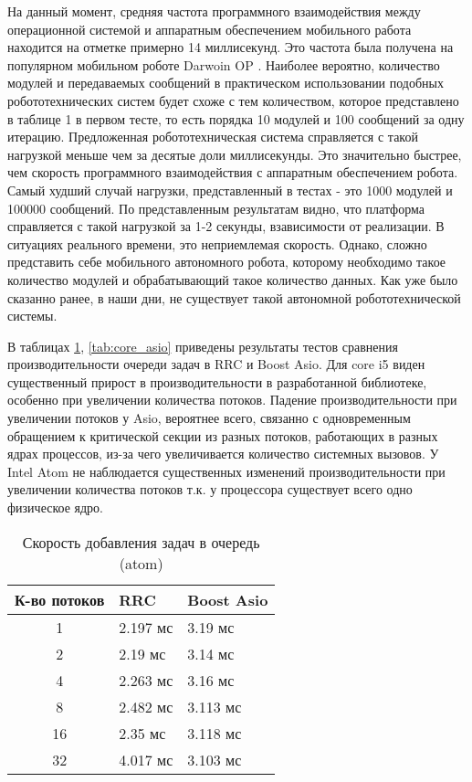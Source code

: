На данный момент, средняя частота программного взаимодействия между операционной системой и аппаратным обеспечением мобильного работа находится на отметке примерно 14 миллисекунд. Это частота была получена на популярном мобильном роботе Darwoin OP \cite{ha2011development}. Наиболее вероятно, количество модулей и передаваемых сообщений в практическом использовании подобных робототехнических систем будет схоже с тем количеством, которое представлено в таблице 1 в первом тесте, то есть порядка 10 модулей и 100 сообщений за одну итерацию. Предложенная робототехническая система справляется с такой нагрузкой меньше чем за десятые доли миллисекунды. Это значительно быстрее, чем скорость программного взаимодействия с аппаратным обеспечением робота. Самый худший случай нагрузки, представленный в тестах - это 1000 модулей и 100000 сообщений. По представленным результатам видно, что платформа справляется с такой нагрузкой за 1-2 секунды, взависимости от реализации. В ситуациях реального времени, это неприемлемая скорость. Однако, сложно представить себе мобильного автономного робота, которому необходимо такое количество модулей и обрабатывающий такое количество данных. Как уже было сказанно ранее, в наши дни, не существует такой автономной робототехнической системы.

В таблицах \ref{tab:atom_asio}, \ref{tab:core_asio} приведены результаты тестов сравнения производительности очереди задач в RRC и Boost Asio. Для core i5 виден существенный прирост в производительности в разработанной библиотеке, особенно при увеличении количества потоков. Падение производительности при увеличении потоков у Asio, вероятнее всего, связанно с одновременным обращением к критической секции из разных потоков, работающих в разных ядрах процессов, из-за чего увеличивается количество системных вызовов. У Intel Atom не наблюдается существенных изменений производительности при увеличении количества потоков т.к. у процессора существует всего одно физическое ядро.

\begin{table}[htb]
    \caption{\label{tab:atom_asio}Скорость добавления задач в очередь (atom)}
    \begin{center}
        \begin{tabularx}{\linewidth}{|c|X|X|}
            \hline
            К-во потоков & RRC & Boost Asio  \\
            \hline
            1 & 2.197 мс & 3.19 мс \\
            \hline
            2 & 2.19 мс & 3.14 мс \\
            \hline
            4 & 2.263 мс & 3.16 мс \\
            \hline
            8 & 2.482 мс & 3.113 мс \\
            \hline
            16 & 2.35 мс & 3.118 мс \\
            \hline
            32 & 4.017 мс & 3.103 мс \\
            \hline
        \end{tabularx}
    \end{center}
\end{table}

